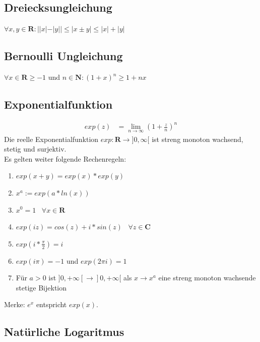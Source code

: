 \documentclass[8pt]{extarticle}
\begin{document}
\begin{multicols*}{3}

\subsection{Dreiecksungleichung}

\begin{center}
  $\forall x, y \in \mathbf{R} : ||x| - |y|| \leq |x \pm y| \leq |x| + |y|$
\end{center}

\subsection{Bernoulli Ungleichung}

\begin{center}
  $ \forall x \in \mathbf{R} \geq -1$ und $n \in \mathbf{N}: (1 + x)^{n} \geq 1 + nx$
\end{center}

\subsection{Exponentialfunktion}

\begin{align*}
  exp(z) &= \lim_{n \rightarrow \infty} (1 + \frac{z}{n})^n
\end{align*}
Die reelle Exponentialfunktion $exp: \mathbf{R} \rightarrow ]0, \infty[$ ist streng monoton wachsend,
stetig und surjektiv.\\
Es gelten weiter folgende Rechenregeln:
\begin{enumerate}
  \item $exp(x + y) = exp(x) * exp(y)$
  \item $x^a := exp(a * ln(x))$
  \item $x^0 = 1 \;\;\; \forall x \in \mathbf{R}$
  \item $exp(iz) = cos(z) + i*sin(z) \;\;\; \forall z \in \mathbf{C}$
  \item $exp(i*\frac{\pi}{2}) = i$
  \item $exp(i\pi) = -1$ und $exp(2\pi i) = 1$
  \item Für $a > 0$ ist $]0, +\infty[ \rightarrow ]0, +\infty[$ als $x \rightarrow x^a$ eine
  streng monoton wachsende stetige Bijektion
\end{enumerate}
Merke: $e^x$ entspricht $exp(x)$.

\subsection{Natürliche Logaritmus}


\end{multicols*}
\end{document}
